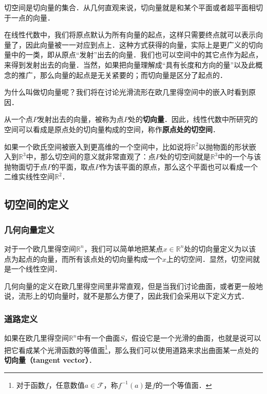 

切空间是切向量的集合．从几何直观来说，切向量就是和某个平面或者超平面相切于一点的向量．

在线性代数中，我们将原点默认为所有向量的起点，这样只需要终点就可以表示向量了，因此向量被一一对应到点上．这种方式获得的向量，实际上是更广义的切向量中的一类，即从原点“发射”出去的向量．我们也可以空间中的其它点作为起点，来得到发射出去的向量．当然，如果把向量理解成“具有长度和方向的量”以及此概念的推广，那么向量的起点是无关紧要的；而切向量是区分了起点的．

为什么叫做切向量呢？我们将在讨论光滑流形在欧几里得空间中的嵌入时看到原因．%

从一个点$P$发射出去的向量，被称为点$P$处的\textbf{切向量}．因此，线性代数中所研究的空间可以看成是原点处的切向量构成的空间，称作\textbf{原点处的切空间}．

如果一个欧氏空间被嵌入到更高维的一个空间中，比如说将$\mathbb{R}^2$以抛物面的形状嵌入到$\mathbb{R}^3$中，那么切空间的意义就非常直观了：点$P$处的切空间就是$\mathbb{R}^3$中的一个与该抛物面切于点$P$的平面，取点$P$作为该平面的原点，那么这个平面也可以看成一个二维实线性空间$\mathbb{R}^2$．

\subsection{切空间的定义}

\subsubsection{几何向量定义}

对于一个欧几里得空间$\mathbb{R}^n$，我们可以简单地把某点$x\in\mathbb{R}^n$处的切向量定义为以该点为起点的向量，而所有该点处的切向量构成一个$x$上的切空间．显然，切空间就是一个线性空间．

几何向量的定义在欧几里得空间里非常直观，但是当我们讨论曲面，或者更一般地说，流形上的切向量时，就不是那么方便了，因此我们会采用以下定义方式．

\subsubsection{道路定义}

如果在欧几里得空间$\mathbb{R}^n$中有一个曲面$S$，假设它是一个光滑的曲面，也就是说可以把它看成某个光滑函数的等值面\footnote{对于函数$f$，任意数值$a\in\mathcal{F}$，称$f^{-1}(a)$是$f$的一个等值面．}，那么我们可以使用道路来求出曲面某一点处的\textbf{切向量（tangent vector）}．

